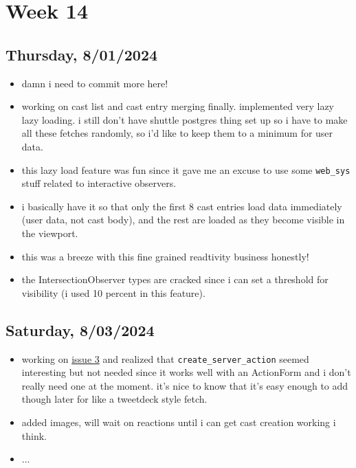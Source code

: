\newpage
\section{Week 14}

\subsection*{Thursday, 8/01/2024}
\begin{itemize}
    \item damn i need to commit more here!
    \item working on cast list and cast entry merging finally. implemented very
        lazy lazy loading. i still don't have shuttle postgres thing set up so i
        have to make all these fetches randomly, so i'd like to keep them to a
        minimum for user data.
    \item this lazy load feature was fun since it gave me an excuse to use some
        \texttt{web_sys} stuff related to interactive observers.
    \item i basically have it so that only the first 8 cast entries load data
        immediately (user data, not cast body), and the rest are loaded as they
        become visible in the viewport.
    \item this was a breeze with this fine grained readtivity business honestly!
    \item the IntersectionObserver types are cracked since i can set a threshold
        for visibility (i used 10 percent in this feature). 
\end{itemize}

\subsection*{Saturday, 8/03/2024}
\begin{itemize}
    \item working on
        \textcolor{blue}{\href{https://github.com/iturner72/thenetworktimes/issues/3}{issue
        3}} and realized that \texttt{create_server_action} seemed interesting
        but not needed since it works well with an ActionForm and i don't really
        need one at the moment. it's nice to know that it's easy enough to add
        though later for like a tweetdeck style fetch.
    \item added images, will wait on reactions until i can get cast creation 
        working i think.
    \item ...
\end{itemize}

